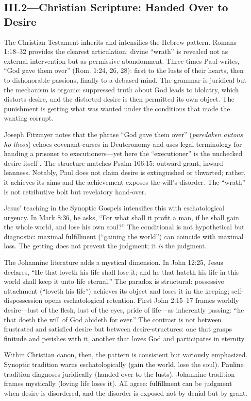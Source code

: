 \subsection*{III.2—Christian Scripture: Handed Over to Desire}
\label{ssec:iii-christian-scripture}

The Christian Testament inherits and intensifies the Hebrew pattern. Romans 1:18--32 provides
the clearest articulation: divine ``wrath'' is revealed not as external intervention but as
permissive abandonment. Three times Paul writes, ``God gave them over'' (Rom. 1:24, 26, 28):
first to the lusts of their hearts, then to dishonorable passions, finally to a debased mind.
The grammar is juridical but the mechanism is organic: suppressed truth about God leads to
idolatry, which distorts desire, and the distorted desire is then permitted its own object.
The punishment is getting what was wanted under the conditions that made the wanting corrupt.

Joseph Fitzmyer notes that the phrase ``God gave them over'' (\emph{paredōken autous ho theos})
echoes covenant-curses in Deuteronomy and uses legal terminology for handing a prisoner to
executioners---yet here the ``executioner'' is the unchecked desire itself
\parencite{FitzmyerRomans1993}. The structure matches Psalm 106:15: outward grant, inward
leanness. Notably, Paul does not claim desire is extinguished or thwarted; rather, it achieves
its aims and the achievement exposes the will's disorder. The ``wrath'' is not retributive
bolt but revelatory hand-over.

Jesus' teaching in the Synoptic Gospels intensifies this with eschatological urgency. In Mark
8:36, he asks, ``For what shall it profit a man, if he shall gain the whole world, and lose
his own soul?'' The conditional is not hypothetical but diagnostic: maximal fulfillment
(``gaining the world'') can coincide with maximal loss. The getting does not prevent the
judgment; it \emph{is} the judgment.

The Johannine literature adds a mystical dimension. In John 12:25, Jesus declares, ``He that
loveth his life shall lose it; and he that hateth his life in this world shall keep it unto
life eternal.'' The paradox is structural: possessive attachment (``loveth his life'')
achieves its object and loses it in the keeping; self-dispossession opens eschatological
retention. First John 2:15--17 frames worldly desire---lust of the flesh, lust of the eyes,
pride of life---as inherently passing: ``he that doeth the will of God abideth for ever.''
The contrast is not between frustrated and satisfied desire but between desire-structures:
one that grasps
finitude and perishes with it, another that loves God and participates in eternity.

Within Christian canon, then, the pattern is consistent but variously emphasized. Synoptic
tradition warns eschatologically (gain the world, lose the soul). Pauline tradition diagnoses
juridically (handed over to the lusts). Johannine tradition frames mystically (loving life
loses it). All agree: fulfillment can be judgment when desire is disordered, and the disorder
is exposed not by denial but by grant.
